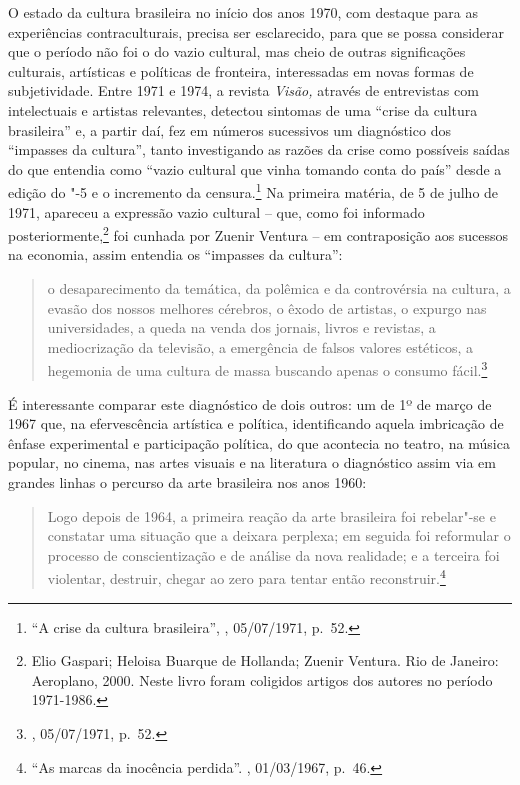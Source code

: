 \asterisc

O estado da cultura brasileira no início dos anos 1970, com destaque
para as experiências contraculturais, precisa ser esclarecido, para que
se possa considerar que o período não foi o do vazio cultural, mas cheio
de outras significações culturais, artísticas e políticas de fronteira,
interessadas em novas formas de subjetividade. Entre 1971 e 1974, a
revista \emph{Visão,} através de entrevistas com intelectuais e artistas
relevantes, detectou sintomas de uma ``crise da cultura brasileira'' e,
a partir daí, fez em números sucessivos um diagnóstico dos ``impasses da
cultura'', tanto investigando as razões da crise como possíveis saídas
do que entendia como ``vazio cultural que vinha tomando conta do
país'' desde a edição do "-5 e o incremento da censura.\footnote{``A
  crise da cultura brasileira'', {}, 05/07/1971, p.~52.} Na
primeira matéria, de 5 de julho de 1971, apareceu a expressão vazio
cultural -- que, como foi informado posteriormente,\footnote{Elio
  Gaspari; Heloisa Buarque de Hollanda; Zuenir Ventura. {} Rio de Janeiro: Aeroplano, 2000.
  Neste livro foram coligidos artigos dos autores no período 1971-1986.}
foi cunhada por Zuenir Ventura -- em contraposição aos sucessos na
economia, assim entendia os ``impasses da cultura'':

\begin{quote}
o desaparecimento da temática, da polêmica e da controvérsia na cultura,
a evasão dos nossos melhores cérebros, o êxodo de artistas, o expurgo
nas universidades, a queda na venda dos jornais, livros e revistas, a
mediocrização da televisão, a emergência de falsos valores estéticos, a
hegemonia de uma cultura de massa buscando apenas o consumo
fácil.\footnote{{}, 05/07/1971, p.~52.}
\end{quote}

É interessante comparar este diagnóstico de dois outros: um de 1º de
março de 1967 que, na efervescência artística e política, identificando
aquela imbricação de ênfase experimental e participação política, do que
acontecia no teatro, na música popular, no cinema, nas artes visuais e
na literatura o diagnóstico assim via em grandes linhas o percurso da
arte brasileira nos anos 1960:

\begin{quote}
Logo depois de 1964, a primeira reação da arte brasileira foi rebelar"-se
e constatar uma situação que a deixara perplexa; em seguida foi
reformular o processo de conscientização e de análise da nova realidade;
e a terceira foi violentar, destruir, chegar ao zero para tentar então
reconstruir.\footnote{``As marcas da inocência perdida''. {},
  01/03/1967, p.~46.}
\end{quote}

